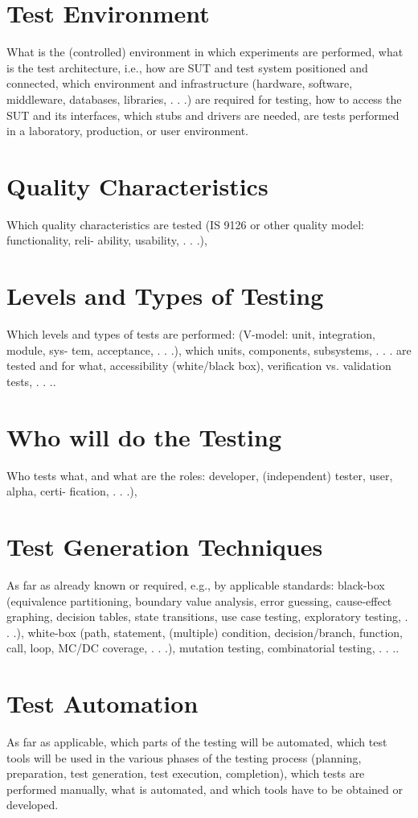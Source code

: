 \documentclass[11pt,a4paper]{article}
\begin{document}
\section{Test Environment}
What is the (controlled) environment in which experiments are performed, what is the test
architecture, i.e., how are SUT and test system positioned and connected, which environment
and infrastructure (hardware, software, middleware, databases, libraries, . . .) are required for
testing, how to access the SUT and its interfaces, which stubs and drivers are needed, are
tests performed in a laboratory, production, or user environment.
\section{Quality Characteristics}
Which quality characteristics are tested (IS 9126 or other quality model: functionality, reli-
ability, usability, . . .),
\section{Levels and Types of Testing}
Which levels and types of tests are performed: (V-model: unit, integration, module, sys-
tem, acceptance, . . .), which units, components, subsystems, . . . are tested and for what,
accessibility (white/black box), verification vs. validation tests, . . ..
\section{Who will do the Testing}
Who tests what, and what are the roles: developer, (independent) tester, user, alpha, certi-
fication, . . .),
\section{Test Generation Techniques}
As far as already known or required, e.g., by applicable standards: black-box (equivalence
partitioning, boundary value analysis, error guessing, cause-effect graphing, decision tables,
state transitions, use case testing, exploratory testing, . . .), white-box (path, statement,
(multiple) condition, decision/branch, function, call, loop, MC/DC coverage, . . .), mutation
testing, combinatorial testing, . . ..
\section{Test Automation}
As far as applicable, which parts of the testing will be automated, which test tools will be
used in the various phases of the testing process (planning, preparation, test generation, test
execution, completion), which tests are performed manually, what is automated, and which
tools have to be obtained or developed.
\end{document}
